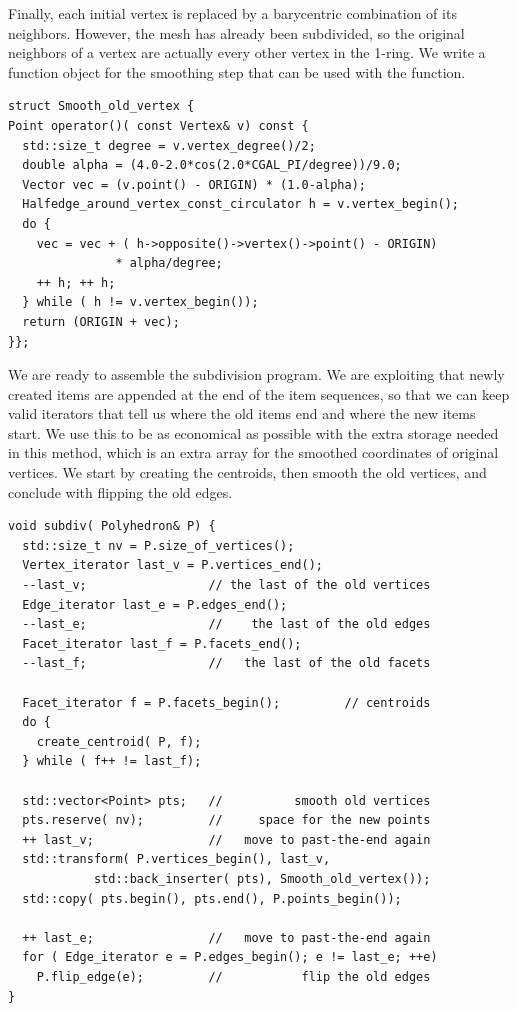 Finally, each initial vertex is replaced by a barycentric combination
of its neighbors. However, the mesh has already been subdivided, so
the original neighbors of a vertex are actually every other vertex in
the 1-ring. We write a function object for the smoothing step that
can be used with the  function.

\begin{lstlisting}
struct Smooth_old_vertex {
Point operator()( const Vertex& v) const {
  std::size_t degree = v.vertex_degree()/2;
  double alpha = (4.0-2.0*cos(2.0*CGAL_PI/degree))/9.0;
  Vector vec = (v.point() - ORIGIN) * (1.0-alpha);
  Halfedge_around_vertex_const_circulator h = v.vertex_begin();
  do {
    vec = vec + ( h->opposite()->vertex()->point() - ORIGIN) 
               * alpha/degree;
    ++ h; ++ h;
  } while ( h != v.vertex_begin());
  return (ORIGIN + vec);
}};
\end{lstlisting}

We are ready to assemble the subdivision program. We are exploiting
that newly created items are appended at the end of the item
sequences, so that we can keep valid iterators that tell us where the
old items end and where the new items start. We use this to be as
economical as possible with the extra storage needed in this method,
which is an extra array for the smoothed coordinates of original
vertices. We start by creating the centroids, then smooth the old
vertices, and conclude with flipping the old edges.

\begin{lstlisting}
void subdiv( Polyhedron& P) {
  std::size_t nv = P.size_of_vertices();
  Vertex_iterator last_v = P.vertices_end();
  --last_v;                 // the last of the old vertices
  Edge_iterator last_e = P.edges_end();
  --last_e;                 //    the last of the old edges
  Facet_iterator last_f = P.facets_end();
  --last_f;                 //   the last of the old facets

  Facet_iterator f = P.facets_begin();         // centroids
  do {
    create_centroid( P, f);
  } while ( f++ != last_f);

  std::vector<Point> pts;   //          smooth old vertices
  pts.reserve( nv);         //     space for the new points
  ++ last_v;                //   move to past-the-end again
  std::transform( P.vertices_begin(), last_v, 
            std::back_inserter( pts), Smooth_old_vertex());
  std::copy( pts.begin(), pts.end(), P.points_begin());

  ++ last_e;                //   move to past-the-end again
  for ( Edge_iterator e = P.edges_begin(); e != last_e; ++e)
    P.flip_edge(e);         //           flip the old edges
}
\end{lstlisting}

